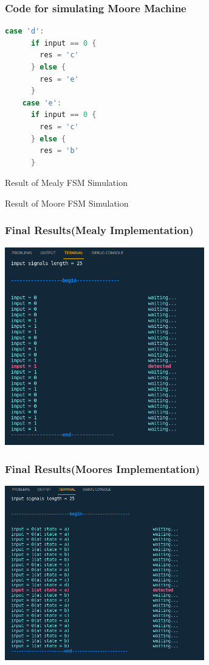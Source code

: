 \documentclass[xcolor=table]{beamer}
\begin{document}
\begin{frame}[fragile]
  \frametitle{Code for simulating Moore Machine}
\begin{lstlisting}[language=go,keywordstyle=\bf,stringstyle=\it]
    case 'd':
      if input == 0 {
        res = 'c'
      } else {
        res = 'e'
      }
    case 'e':
      if input == 0 {
        res = 'c'
      } else {
        res = 'b'
      }
  \end{lstlisting}
\end{frame}

\begin{frame}{Result of Mealy FSM Simulation}
\end{frame}

\begin{frame}{Result of Moore FSM Simulation}
\end{frame}

\begin{frame}
  \frametitle{Final Results(Mealy Implementation)}
    \includegraphics[width=0.65\textwidth, height=0.85\textheight]{./static/res_mealy_sim.png}
\end{frame}

\begin{frame}
  \frametitle{Final Results(Moores Implementation)}
    \includegraphics[width=0.65\textwidth, height=0.85\textheight]{./static/sim_res_moore.png}
\end{frame}
\end{document}
